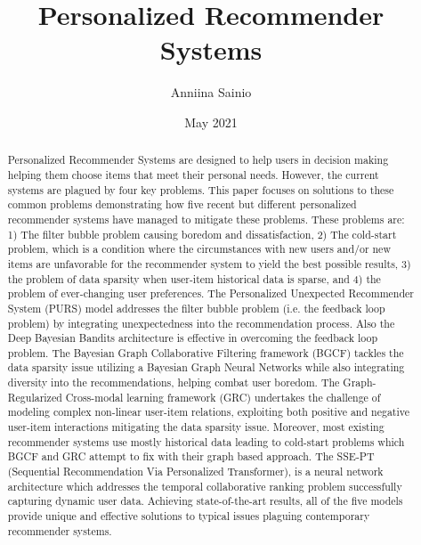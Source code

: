 \documentclass[english,twoside,censored,tkt]{HYthesisML}
\title{
Personalized Recommender Systems}
\author{Anniina Sainio}
\date{May 2021}
\begin{document}
\maketitle
\begin{otherlanguage}{english}
\begin{abstract}
Personalized Recommender Systems are designed to help users in decision making helping them choose items that meet their personal needs. However, the current systems are plagued by four key problems. This paper focuses on solutions to these common problems demonstrating how five recent but different personalized recommender systems have managed to mitigate these problems. These problems are: 1) The filter bubble problem causing boredom and dissatisfaction, 2) The cold-start problem, which is a condition where the circumstances  with new users and/or new items are unfavorable for the recommender system to yield the best possible results, 3) the problem of data sparsity when user-item historical data is sparse, and 4) the problem of ever-changing user preferences. The Personalized Unexpected Recommender System (PURS) model addresses the filter bubble problem (i.e. the feedback loop problem) by integrating unexpectedness into the recommendation process. Also the Deep Bayesian Bandits architecture is effective in overcoming the feedback loop problem. The Bayesian Graph Collaborative Filtering framework (BGCF) tackles the data sparsity issue utilizing a Bayesian Graph Neural Networks while also integrating diversity into the recommendations, helping combat user boredom. The Graph-Regularized Cross-modal learning framework (GRC) undertakes the challenge of modeling complex non-linear user-item relations, exploiting both positive and negative user-item interactions mitigating the data sparsity issue. Moreover, most existing recommender systems use mostly historical data leading to cold-start problems which BGCF and GRC attempt to fix with their graph based approach. The SSE-PT (Sequential Recommendation Via Personalized Transformer), is a neural network architecture which addresses the temporal collaborative ranking problem successfully capturing dynamic user data. Achieving state-of-the-art results, all of the five models provide unique and effective solutions to typical issues plaguing contemporary recommender systems.
\end{abstract}
\end{otherlanguage}

\newpage
\mytableofcontents
\frontmatter
\mainmatter

{}  
\printbibliography
\end{document}
